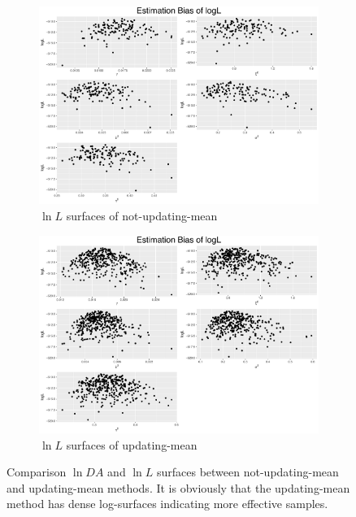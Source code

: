 \begin{figure}[h]
\begin{subfigure}[t]{0.45\textwidth}
	\includegraphics[width=\textwidth]{Chapters/05MCMCOU/plots/realdataestbiaslogLnoupdate.pdf}
	\caption{$\ln L$ surfaces of not-updating-mean}
\end{subfigure}
\begin{subfigure}[t]{0.45\textwidth}
	\includegraphics[width=\textwidth]{Chapters/05MCMCOU/plots/realdataestbiaslogLupdate.pdf}
	\caption{$\ln L$ surfaces of updating-mean}
\end{subfigure}
\caption{Comparison $\ln DA$ and $\ln L$ surfaces between not-updating-mean and updating-mean methods. It is obviously that the updating-mean method has dense log-surfaces indicating more effective samples.} \label{comparenotanupDAL}
\end{figure}

